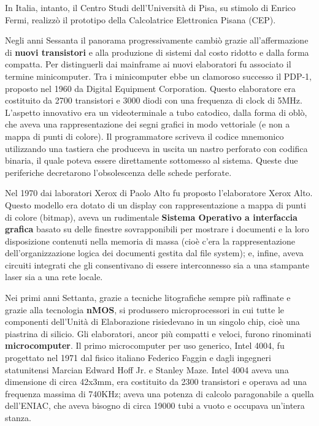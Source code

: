 \documentclass[12pt]{article} %
\begin{document}
In Italia, intanto, il Centro Studi dell’Università di Pisa, su stimolo di Enrico Fermi, realizzò il prototipo della Calcolatrice Elettronica Pisana (CEP).\par\medskip\noindent
Negli anni Sessanta il panorama progressivamente cambiò grazie all’affermazione di \textbf{nuovi transistori} e alla produzione di sistemi dal costo ridotto e dalla forma compatta. Per distinguerli dai mainframe ai nuovi elaboratori fu associato il termine minicomputer. Tra i minicomputer ebbe un clamoroso successo il PDP-1, proposto nel 1960 da Digital Equipment Corporation. Questo elaboratore era costituito da 2700 transistori e 3000 diodi con una frequenza di clock di 5MHz. L’aspetto innovativo era un videoterminale a tubo catodico, dalla forma di oblò, che aveva una rappresentazione dei segni grafici in modo vettoriale (e non a mappa di punti di colore). Il programmatore scriveva il codice mnemonico utilizzando una tastiera che produceva in uscita un nastro perforato con codifica binaria, il quale poteva essere direttamente sottomesso al sistema. Queste due periferiche decretarono l’obsolescenza delle schede perforate. \par\medskip\noindent
Nel 1970 dai laboratori Xerox di Paolo Alto fu proposto l’elaboratore Xerox Alto. Questo modello era dotato di un display con rappresentazione a mappa di punti di colore (bitmap), aveva un rudimentale \textbf{Sistema Operativo a interfaccia grafica} basato su delle finestre sovrapponibili per mostrare i documenti e la loro disposizione contenuti nella memoria di massa (cioè c’era la rappresentazione dell’organizzazione logica dei documenti gestita dal file system); e, infine, aveva circuiti integrati che gli consentivano di essere interconnesso sia a una stampante laser sia a una rete locale.\par\medskip\noindent
Nei primi anni Settanta, grazie a tecniche litografiche sempre più raffinate e grazie alla tecnologia \textbf{nMOS}, si produssero microprocessori in cui tutte le componenti dell’Unità di Elaborazione risiedevano in un singolo chip, cioè una piastrina di silicio. Gli elaboratori, ancor più compatti e veloci, furono rinominati \textbf{microcomputer}. Il primo microcomputer per uso generico, Intel 4004, fu progettato nel 1971 dal fisico italiano Federico Faggin e dagli ingegneri statunitensi Marcian Edward Hoff Jr. e Stanley Maze.  Intel 4004 aveva una dimensione di circa 42x3mm, era costituito da 2300 transistori e operava ad una frequenza massima di 740KHz; aveva una potenza di calcolo paragonabile a quella dell’ENIAC, che aveva bisogno di circa 19000 tubi a vuoto e occupava un’intera stanza.\par\medskip\noindent
\end{document}
